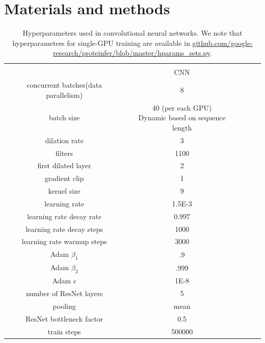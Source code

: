   \section*{Materials and methods}
  \DIFdelbegin %
\DIFdelendFL \DIFaddbeginFL \begin{table}[htbp]
    \DIFaddendFL \centering
    \def\arraystretch{1.1}
    \begin{tabular}{|c|c|c|c|c|}
    \hline
                               & \\
                               & CNN \\
    \Xhline{1pt}
    concurrent batches(data parallelism) & 8 \\
    \hline
    batch size                 & \shortstack{40 (per each GPU) \\ Dynamic based on sequence length} \\
    \hline
    dilation rate              & 3 \\
    \hline
    filters                    & 1100  \\
    \hline
    first dilated layer        & 2 \\
    \hline
    gradient clip              & 1 \\
    \hline
    kernel size                & 9 \\
    \hline
    learning rate              & 1.5E-3 \\
    \hline
    learning rate decay rate   & 0.997 \\
    \hline
    learning rate decay steps  & 1000 \\
    \hline
    learning rate warmup steps & 3000 \\
    \hline
    Adam $\beta_1$              & .9 \\
    \hline
    Adam $\beta_2$              & .999 \\
    \hline
    Adam $\epsilon$             & 1E-8 \\
    \hline
    number of ResNet layers     & 5 \\
    \hline
    pooling                     & mean \\
    \hline
    ResNet bottleneck factor    & 0.5 \\
    \hline
    train steps                 & 500000 \\
    \hline
    \end{tabular}
    \caption{Hyperparameters used in convolutional neural networks. We note that hyperparameters for single-GPU training are available in \url{github.com/google-research/proteinfer/blob/master/hparams_sets.py}.}
    \label{tab:nn_hparams}
    \DIFdelbeginFL %
\DIFdelend \DIFaddbegin \end{table} 
 \DIFaddend 


